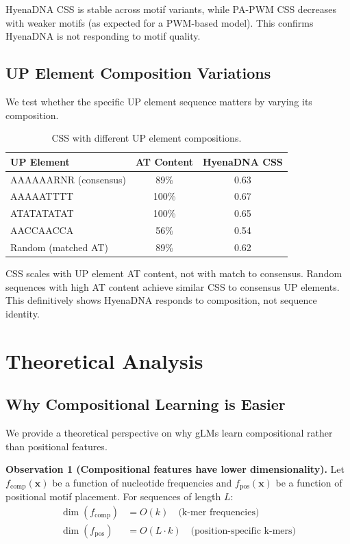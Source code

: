 \documentclass{article}
\begin{document}
HyenaDNA CSS is stable across motif variants, while PA-PWM CSS decreases with weaker motifs (as expected for a PWM-based model). This confirms HyenaDNA is not responding to motif quality.

\subsection{UP Element Composition Variations}

We test whether the specific UP element sequence matters by varying its composition.

\begin{table}[H]
\caption{CSS with different UP element compositions.}
\begin{center}
\small
\begin{tabular}{lcc}
\toprule
UP Element & AT Content & HyenaDNA CSS \\
\midrule
AAAAAARNR (consensus) & 89\% & 0.63 \\
AAAAATTTT & 100\% & 0.67 \\
ATATATATAT & 100\% & 0.65 \\
AACCAACCA & 56\% & 0.54 \\
Random (matched AT) & 89\% & 0.62 \\
\bottomrule
\end{tabular}
\end{center}
\end{table}

CSS scales with UP element AT content, not with match to consensus. Random sequences with high AT content achieve similar CSS to consensus UP elements. This definitively shows HyenaDNA responds to composition, not sequence identity.

\section{Theoretical Analysis}
\label{app:theory}

\subsection{Why Compositional Learning is Easier}

We provide a theoretical perspective on why gLMs learn compositional rather than positional features.

\textbf{Observation 1 (Compositional features have lower dimensionality).} Let $f_{\text{comp}}(\mathbf{x})$ be a function of nucleotide frequencies and $f_{\text{pos}}(\mathbf{x})$ be a function of positional motif placement. For sequences of length $L$:
\begin{align}
\dim(f_{\text{comp}}) &= O(k) \quad \text{(k-mer frequencies)} \\
\dim(f_{\text{pos}}) &= O(L \cdot k) \quad \text{(position-specific k-mers)}
\end{align}
\end{document}
